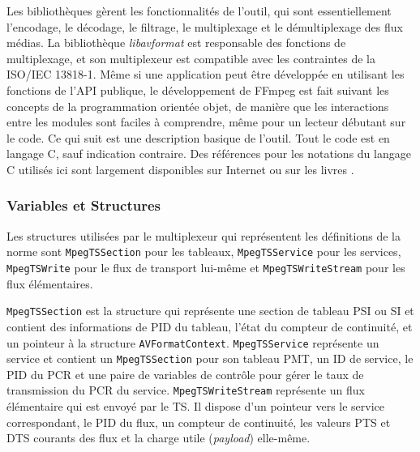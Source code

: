 \documentclass[12pt,a4paper]{article}
\begin{document}
Les bibliothèques gèrent les fonctionnalités de l'outil, qui sont essentiellement l'encodage, le décodage, le filtrage, le multiplexage et le démultiplexage des flux médias. La bibliothèque \textit{libavformat} est responsable des fonctions de multiplexage, et son multiplexeur est compatible avec les contraintes de la ISO/IEC 13818-1. Même si une application peut être développée en utilisant les fonctions de l'API publique, le développement de FFmpeg est fait suivant les concepts de la programmation orientée objet, de manière que les interactions entre les modules sont faciles à comprendre, même pour un lecteur débutant sur le code. Ce qui suit est une description basique de l'outil. Tout le code est en langage C, sauf indication contraire. Des références pour les notations du langage C utilisés ici sont largement disponibles sur Internet \cite{cpp_reference} ou sur les livres \cite{ritchie}.

\subsubsection{Variables et Structures}



Les structures utilisées par le multiplexeur qui représentent les définitions de la norme sont \texttt{MpegTSSection} pour les tableaux, \texttt{MpegTSService} pour les services, \texttt{MpegTSWrite} pour le flux de transport lui-même et \texttt{MpegTSWriteStream} pour les flux élémentaires.

\texttt{MpegTSSection} est la structure qui représente une section de tableau PSI ou SI et contient des informations de PID du tableau, l'état du compteur de continuité, et un pointeur à la structure \texttt{AVFormatContext}. \texttt{MpegTSService} représente un service et contient un \texttt{MpegTSSection} pour son tableau PMT, un ID de service, le PID du PCR et une paire de variables de contrôle pour gérer le taux de transmission du PCR du service. \texttt{MpegTSWriteStream} représente un flux élémentaire qui est envoyé par le TS. Il dispose d'un pointeur vers le service correspondant, le PID du flux, un compteur de continuité, les valeurs PTS et DTS courants des flux et la charge utile (\textit{payload}) elle-même.
\end{document}
